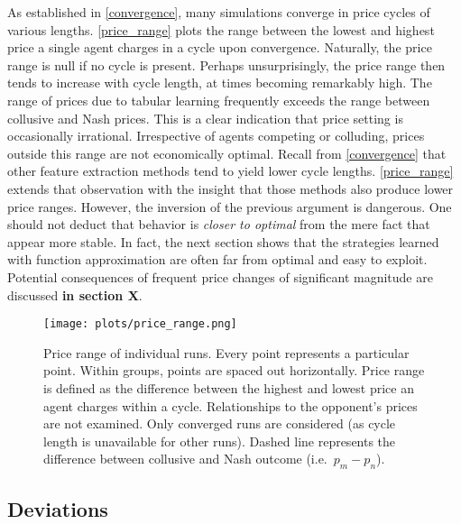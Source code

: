 As established in \autoref{convergence}, many simulations converge in price cycles of various lengths. \autoref{price_range} plots the range between the lowest and highest price a single agent charges in a cycle upon convergence. Naturally, the price range is null if no cycle is present. Perhaps unsurprisingly, the price range then tends to increase with cycle length, at times becoming remarkably high. The range of prices due to tabular learning frequently exceeds the range between collusive and Nash prices. This is a clear indication that price setting is occasionally irrational. Irrespective of agents competing or colluding, prices outside this range are not economically optimal. Recall from \autoref{convergence} that other feature extraction methods tend to yield lower cycle lengths. \autoref{price_range} extends that observation with the insight that those methods also produce lower price ranges. However, the inversion of the previous argument is dangerous. One should not deduct that behavior is \emph{closer to optimal} from the mere fact that appear more stable. In fact, the next section shows that the strategies learned with function approximation are often far from optimal and easy to exploit. Potential consequences of frequent price changes of significant magnitude are discussed \textbf{in section X}.

\begin{figure}
	\texttt{[image: plots/price\_range.png]}
	\caption{Price range of individual runs. Every point represents a particular point. Within groups, points are spaced out horizontally. Price range is defined as the difference between the highest and lowest price an agent charges within a cycle. Relationships to the opponent's prices are not examined. Only converged runs are considered (as cycle length is unavailable for other runs). Dashed line represents the difference between collusive and Nash outcome (i.e.\ $p_m - p_n$).}
	\label{price_range}
\end{figure}


\subsection{Deviations}\label{deviations}

